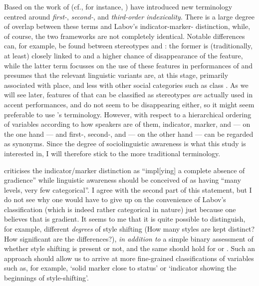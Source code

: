 Based on the work of \citeauthor{silverstein2003} (cf., for instance, \citealt{silverstein2003}) \textcite[cf.][78]{johnstoneetal2006} have introduced new terminology centred around \emph{first-}, \emph{second-}, and \emph{third-order indexicality}.
There is a large degree of overlap between these terms and Labov's indicator-marker- distinction, while, of course, the two frameworks are not completely identical.
Notable differences can, for example, be found between stereotypes and : the former is (traditionally, at least) closely linked to  and a higher chance of disappearance of the feature, while the latter term focusses on the  use of these features in performances of  and presumes that the relevant linguistic variants are, at this stage, primarily associated with place, and less with other social categories such as class \parencite[cf.][81--84]{johnstoneetal2006}.
As we will see later, features of  that can be classified as  stereotypes \emph{are} actually used in accent performances, and do not seem to be disappearing either, so it might seem preferable to use \citeauthor{johnstoneetal2006}'s terminology.
However, with respect to a hierarchical ordering of variables according to how  speakers are of them, indicator, marker, and  --- on the one hand --- and first-, second-, and  --- on the other hand --- can be regarded as synonyms.
Since the degree of sociolinguistic awareness is what this study is interested in, I will therefore stick to the more traditional  terminology.

\textcite[6]{racz2013} criticises the indicator/marker distinction as ``impl[ying] a complete absence of gradience'' while linguistic awareness should be conceived of as having ``many levels, very few categorical''.
I agree with the second part of this statement, but I do not see why one would have to give up on the convenience of Labov's classification (which is indeed rather categorical in nature) just because one believes that  is gradient.
It seems to me that it is quite possible to distinguish, for example, different \emph{degrees} of style shifting (How many styles are kept distinct? How significant are the differences?), \emph{in addition to} a simple binary assessment of whether style shifting is present or not, and the same should hold for  or .
Such an approach should allow us to arrive at more fine-grained classifications of variables such as, for example, `solid marker close to  status' or `indicator showing the beginnings of style-shifting'.

